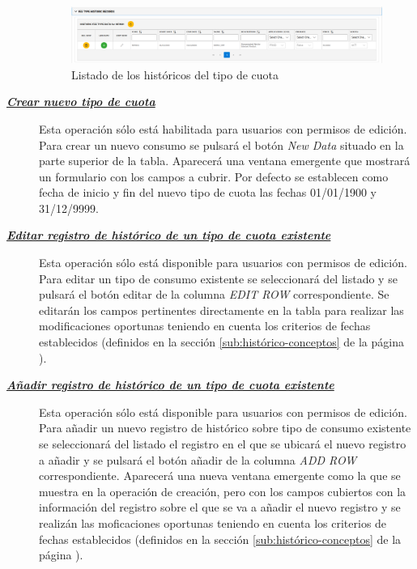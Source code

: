\begin{description}
\begin{figure}[H]
  \centering
  \includegraphics[width=\textwidth]{imaxes/listado-historicos-tipo-cuota.png}
  \caption{Listado de los históricos del tipo de cuota}
  \label{fig:listado-historicos-tipo-cuota}
\end{figure}


\item[\underline{\textsl{\textbf{Crear nuevo tipo de cuota}}}] Esta operación sólo está habilitada para usuarios con permisos de edición.
Para crear un nuevo consumo se pulsará el botón \textit{New Data} situado en la parte superior de la tabla. Aparecerá una ventana emergente que mostrará un formulario con los campos a cubrir. Por defecto se establecen como fecha de inicio y fin del nuevo tipo de cuota las fechas 01/01/1900 y 31/12/9999.

\item[\underline{\textsl{\textbf{Editar registro de histórico de un tipo de cuota existente}}}] Esta operación sólo está disponible para usuarios con permisos de edición.
Para editar un tipo de consumo existente se seleccionará del listado y se pulsará el botón editar de la columna \textit{EDIT ROW} correspondiente. Se editarán los campos pertinentes directamente en la tabla para realizar las modificaciones oportunas teniendo en cuenta los criterios de fechas establecidos (definidos en la sección \ref{sub:histórico-conceptos} de la página \pageref{sub:histórico-conceptos}).

\item[\underline{\textsl{\textbf{Añadir registro de histórico de un tipo de cuota existente}}}] Esta operación sólo está disponible para usuarios con permisos de edición.
Para añadir un nuevo registro de histórico sobre tipo de consumo existente se seleccionará del listado el registro en el que se ubicará el nuevo registro a añadir 
y se pulsará el botón añadir de la columna \textit{ADD ROW} correspondiente. Aparecerá una nueva ventana emergente como la que se muestra en la operación de creación, pero con los campos cubiertos con la información del registro sobre el que se va a añadir el nuevo registro y se realizán las moficaciones oportunas teniendo en cuenta los criterios de fechas establecidos (definidos en la sección \ref{sub:histórico-conceptos} de la página \pageref{sub:histórico-conceptos}).


\end{description}
